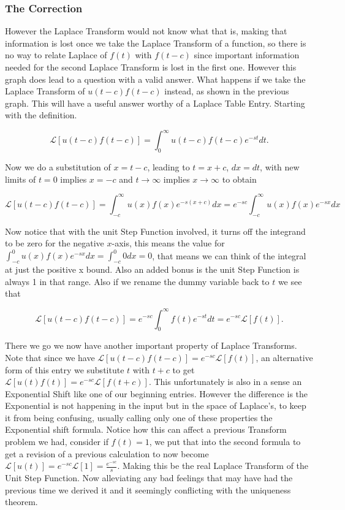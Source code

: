 \documentclass[12pt]{article}
\newcommand{\lp}{\mathscr{L}}
\begin{document}
\subsubsection{The Correction}

However the Laplace Transform would not know what that is, making that information is lost once we take the Laplace Transform of a function, so there is no way to relate Laplace of $f(t)$ with $f(t-c)$ since important information needed for the second Laplace Transform is lost in the first one. However this graph does lead to a question with a valid answer. What happens if we take the Laplace Transform of $u(t-c)f(t-c)$ instead, as shown in the previous graph. This will have a useful answer worthy of a Laplace Table Entry. Starting with the definition.

\begin{equation*}
    \lp[u(t-c)f(t-c)]=\int_0^{\infty} u(t-c)f(t-c)e^{-st}dt.
\end{equation*}

Now we do a substitution of $x=t-c$, leading to $t=x+c$, $dx=dt$, with new limits of $t=0$ implies $x=-c$ and $t\rightarrow\infty$ implies $x\rightarrow\infty$ to obtain

\begin{equation*}
    \lp[u(t-c)f(t-c)]=\int_{-c}^{\infty} u(x)f(x)e^{-s(x+c)}dx = e^{-sc}\int_{-c}^{\infty} u(x)f(x)e^{-sx}dx
\end{equation*}

Now notice that with the unit Step Function involved, it turns off the integrand to be zero for the negative $x$-axis, this means the value for $\int_{-c}^{0} u(x)f(x)e^{-sx}dx=\int_{-c}^{0}0dx=0$, that means we can think of the integral at just the positive x bound. Also an added bonus is the unit Step Function is always 1 in that range. Also if we rename the dummy variable back to $t$ we see that

\begin{equation*}
    \lp[u(t-c)f(t-c)]=e^{-sc}\int_{0}^{\infty}f(t)e^{-st}dt=e^{-sc}\lp[f(t)].
\end{equation*}

There we go we now have another important property of Laplace Transforms. Note that since we have $\lp[u(t-c)f(t-c)]=e^{-sc}\lp[f(t)]$, an alternative form of this entry we substitute $t$ with $t+c$ to get $\lp[u(t)f(t)]=e^{-sc}\lp[f(t+c)]$. This unfortunately is also in a sense an Exponential Shift like one of our beginning entries. However the difference is the Exponential is not happening in the input but in the space of Laplace's, to keep it from being confusing, usually calling only one of these properties the Exponential shift formula. Notice how this can affect a previous Transform problem we had, consider if $f(t)=1$, we put that into the second formula to get a revision of a previous calculation to now become $\lp[u(t)]=e^{-sc}\lp[1]=\frac{e^{-sc}}{s}$. Making this be the real Laplace Transform of the Unit Step Function. Now alleviating any bad feelings that may have had the previous time we derived it and it seemingly conflicting with the uniqueness theorem. \\
\end{document}

